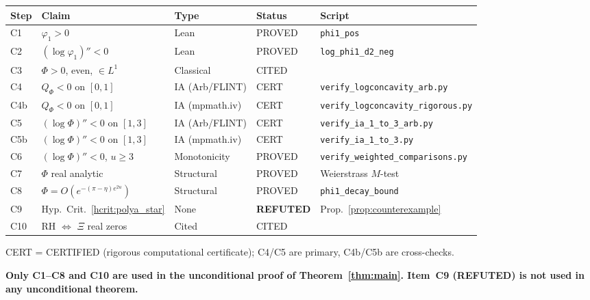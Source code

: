 \documentclass[11pt]{article}
\theoremstyle{definition}
\theoremstyle{remark}
\begin{document}
\begin{center}\footnotesize
\begin{tabular}{@{}lp{2.8cm}p{2.4cm}lp{2.8cm}@{}}
\toprule
Step & Claim & Type & Status & Script \\
\midrule
C1 & $\varphi_1 > 0$ & Lean & PROVED & \texttt{phi1\_pos} \\
C2 & $(\log\varphi_1)'' < 0$ & Lean & PROVED & \texttt{log\_phi1\_d2\_neg} \\
C3 & $\Phi > 0$, even, $\in L^1$ & Classical & CITED & \cite{titchmarsh1986,csordas1989} \\
C4 & $Q_\Phi < 0$ on $[0,1]$ & IA (Arb/FLINT) & CERT & \texttt{verify\_logconcavity\_arb.py} \\
C4b & $Q_\Phi < 0$ on $[0,1]$ & IA (mpmath.iv) & CERT & \texttt{verify\_logconcavity\_rigorous.py} \\
C5 & $(\log\Phi)'' < 0$ on $[1,3]$ & IA (Arb/FLINT) & CERT & \texttt{verify\_ia\_1\_to\_3\_arb.py} \\
C5b & $(\log\Phi)'' < 0$ on $[1,3]$ & IA (mpmath.iv) & CERT & \texttt{verify\_ia\_1\_to\_3.py} \\
C6 & $(\log\Phi)'' < 0$, $u\geq 3$ & Monotonicity & PROVED & \texttt{verify\_weighted\_comparisons.py} \\
C7 & $\Phi$ real analytic & Structural & PROVED & Weierstrass $M$-test \\
C8 & $\Phi = O(e^{-(\pi-\eta) e^{2u}})$ & Structural & PROVED & \texttt{phi1\_decay\_bound} \\
C9 & Hyp.\ Crit.~\ref{hcrit:polya_star} & None &
  \textbf{REFUTED} & Prop.~\ref{prop:counterexample} \\
C10 & RH $\Leftrightarrow$ $\Xi$ real zeros & Cited & CITED & \cite[\S2.1]{titchmarsh1986} \\
\bottomrule
\end{tabular}
\end{center}
\noindent\footnotesize CERT = CERTIFIED (rigorous computational certificate);
C4/C5 are primary, C4b/C5b are cross-checks.\normalsize

\noindent\textbf{Only C1--C8 and C10 are used in the unconditional proof of
Theorem~\ref{thm:main}.
Item~C9 (REFUTED) is not used in any unconditional theorem.}
\end{document}
